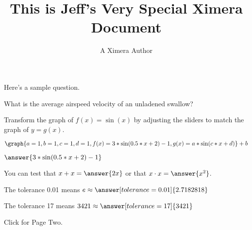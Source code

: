 \documentclass{ximera}
\title{This is Jeff's Very Special Ximera Document}
\author{A Ximera Author}
\begin{document}
\maketitle

Here's a sample question.

\begin{problem}
\begin{multipleChoice}
\end{multipleChoice}
\end{problem}

What is the average airspeed velocity of an unladened swallow?

\begin{problem}
\begin{multipleChoice}
\end{multipleChoice}
\end{problem}

\begin{problem}
Transform the graph of $f(x) = \sin(x)$ by adjusting the sliders to match the graph of $y = g(x)$.

\[\graph{a = 1, b = 1, c = 1,d = 1,f(x) = 3*\sin(0.5*x + 2) - 1, g(x) = a*\sin(c*x + d)}+b \]

$\answer{3*\sin(0.5*x + 2) - 1}$
\end{problem}

\begin{problem}
   You can test that $x + x = \answer{2x}$ or that $x \cdot x = \answer{x^2}$.
\end{problem}

\begin{problem}
   The tolerance 0.01 means $e \approx \answer[tolerance=0.01]{2.7182818}$
\end{problem}

\begin{problem}
   The tolerance 17 means $3421 \approx \answer[tolerance=17]{3421}$
\end{problem}

Click  for Page Two.
\end{document}
